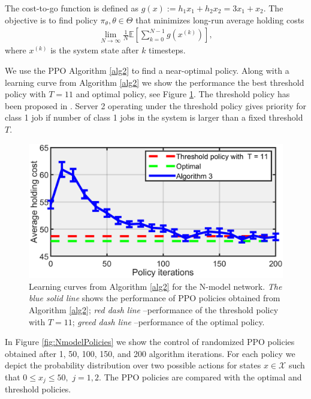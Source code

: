 \documentclass[11pt]{article}
\newcommand{\E}{\mathbb{E}}
\newcommand{\X}{\mathcal{X}}
\theoremstyle{definition}
\numberwithin{equation}{section}
\begin{document}
The cost-to-go function is defined as $g(x) := h_1x_1 +h_2x_2 = 3x_1+x_2.$  The objective is to find policy $\pi_\theta, \theta\in \Theta$ that minimizes long-run average holding costs
\begin{align*}
\lim\limits_{N\rightarrow \infty} \frac{1}{N}  \E\left[\sum_{k=0}^{N-1}g\left(x^{(k)}\right)\right],
\end{align*}
where $x^{(k)}$ is the system state after $k$ timesteps.


We use the PPO Algorithm \ref{alg2} to find a near-optimal policy. Along with a learning curve from Algorithm \ref{alg2} we show the performance the best threshold policy with $T=11$ and optimal policy, see Figure \ref{fig:NmodelCurves}. The threshold policy has been proposed in \cite{Bell2001}. Server 2 operating under the  threshold policy  gives priority for class 1 job if number of class 1 jobs in the system is larger than a fixed threshold $T$.



 \begin{figure}[H]
\centering%
\includegraphics[width=.5\linewidth]{Npaper}
\caption[]{Learning curves from Algorithm \ref{alg2} for the N-model network.  \textit{The blue solid line} shows the performance of  PPO policies obtained from Algorithm \ref{alg2};      \textit{red dash line} --performance of the threshold policy with $T=11$; \textit{greed dash line} --performance of the optimal policy.}
\label{fig:NmodelCurves}%
\end{figure}



In Figure \ref{fig:NmodelPolicies} we show the control of randomized PPO policies obtained after 1, 50, 100, 150, and 200 algorithm iterations.  For each policy  we depict the probability distribution over two possible actions for states $x\in \X$ such that $0\leq x_j\leq 50,$ $j=1, 2$. The PPO policies are compared with the optimal and threshold policies.
\end{document}
